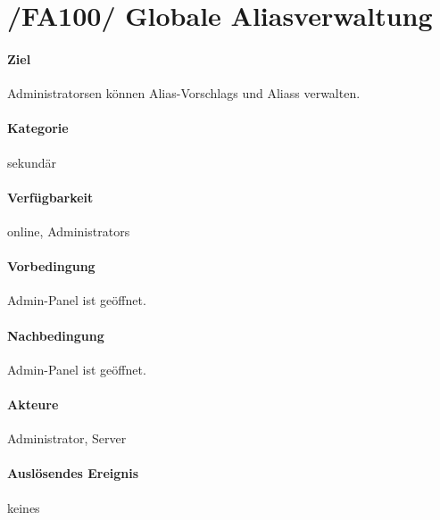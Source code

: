 \section[Globale Aliasverwaltung]{/FA100/ Globale Aliasverwaltung}
\label{Aliasverwaltungsfunktion}
\paragraph{Ziel}
\Glspl{Administrator}en können \Glspl{Alias-Vorschlag} und  \Glspl{Alias} verwalten.
\paragraph{Kategorie}
sekundär
\paragraph{Verfügbarkeit}
online, \Glspl{Administrator}
\paragraph{Vorbedingung}
\Gls{Admin-Panel} ist geöffnet.
\paragraph{Nachbedingung}
\Gls{Admin-Panel} ist geöffnet.
\paragraph{Akteure}
\Gls{Administrator}, \Gls{Server}
\paragraph{Auslösendes Ereignis}
keines
